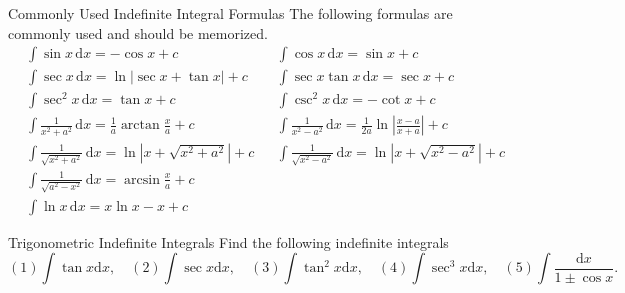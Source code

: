 \begin{proposition}{Commonly Used Indefinite Integral Formulas}{}
  The following formulas are commonly used and should be memorized.
  \begin{align}
      &\int \sin x \, \mathrm{d}x = -\cos x + c 
      && \int \cos x \, \mathrm{d}x = \sin x + c \\
      &\int \sec x \, \mathrm{d}x = \ln|\sec x + \tan x| + c 
      && \int \sec x \tan x \, \mathrm{d}x = \sec x + c \\
      &\int \sec^2 x \, \mathrm{d}x = \tan x + c 
      && \int \csc^2 x \, \mathrm{d}x = -\cot x + c \\
      &\int \frac{1}{x^2 + a^2} \, \mathrm{d}x = \frac{1}{a} \arctan \frac{x}{a} + c 
      && \int \frac{1}{x^2 - a^2} \, \mathrm{d}x = \frac{1}{2a} \ln \left| \frac{x-a}{x+a} \right| + c \\
      &\int \frac{1}{\sqrt{x^2 + a^2}} \, \mathrm{d}x = \ln \left| x + \sqrt{x^2 + a^2} \right| + c 
      && \int \frac{1}{\sqrt{x^2 - a^2}} \, \mathrm{d}x = \ln \left| x + \sqrt{x^2 - a^2} \right| + c \\
      &\int \frac{1}{\sqrt{a^2 - x^2}} \, \mathrm{d}x = \arcsin \frac{x}{a} + c 
      && {} \\
      &\int \ln x \, \mathrm{d}x = x \ln x - x + c 
      && {}
  \end{align}
\end{proposition}

\begin{example}{Trigonometric Indefinite Integrals}{}
  Find the following indefinite integrals
  \begin{equation}
    (1) \int \tan x\mathrm{d} x, \quad
    (2) \int \sec x \mathrm{d} x, \quad
    (3) \int \tan^2 x \mathrm{d}x, \quad
    (4) \int \sec^3 x \mathrm{d} x, \quad
    (5) \int \frac{\mathrm{d} x}{1 \pm \cos x}.
  \end{equation}
\end{example}

